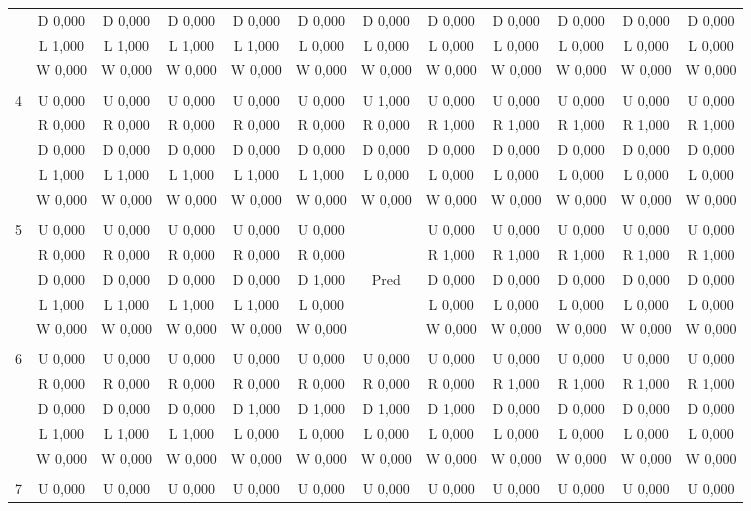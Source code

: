 \begin{table}[htbp]
\begin{tiny}
\begin{tabular}{c|c|c|c|c|c|c|c|c|c|c|c|}
&D 0,000&D 0,000&D 0,000&D 0,000&D 0,000&D 0,000&D 0,000&D 0,000&D 0,000&D 0,000&D 0,000\\
&L 1,000&L 1,000&L 1,000&L 1,000&L 0,000&L 0,000&L 0,000&L 0,000&L 0,000&L 0,000&L 0,000\\
&W 0,000&W 0,000&W 0,000&W 0,000&W 0,000&W 0,000&W 0,000&W 0,000&W 0,000&W 0,000&W 0,000\\
\hline \\
4&U 0,000&U 0,000&U 0,000&U 0,000&U 0,000&U 1,000&U 0,000&U 0,000&U 0,000&U 0,000&U 0,000\\
&R 0,000&R 0,000&R 0,000&R 0,000&R 0,000&R 0,000&R 1,000&R 1,000&R 1,000&R 1,000&R 1,000\\
&D 0,000&D 0,000&D 0,000&D 0,000&D 0,000&D 0,000&D 0,000&D 0,000&D 0,000&D 0,000&D 0,000\\
&L 1,000&L 1,000&L 1,000&L 1,000&L 1,000&L 0,000&L 0,000&L 0,000&L 0,000&L 0,000&L 0,000\\
&W 0,000&W 0,000&W 0,000&W 0,000&W 0,000&W 0,000&W 0,000&W 0,000&W 0,000&W 0,000&W 0,000\\
\hline \\
5&U 0,000&U 0,000&U 0,000&U 0,000&U 0,000&&U 0,000&U 0,000&U 0,000&U 0,000&U 0,000\\
&R 0,000&R 0,000&R 0,000&R 0,000&R 0,000&&R 1,000&R 1,000&R 1,000&R 1,000&R 1,000\\
&D 0,000&D 0,000&D 0,000&D 0,000&D 1,000&Pred&D 0,000&D 0,000&D 0,000&D 0,000&D 0,000\\
&L 1,000&L 1,000&L 1,000&L 1,000&L 0,000&&L 0,000&L 0,000&L 0,000&L 0,000&L 0,000\\
&W 0,000&W 0,000&W 0,000&W 0,000&W 0,000&&W 0,000&W 0,000&W 0,000&W 0,000&W 0,000\\
\hline \\
6&U 0,000&U 0,000&U 0,000&U 0,000&U 0,000&U 0,000&U 0,000&U 0,000&U 0,000&U 0,000&U 0,000\\
&R 0,000&R 0,000&R 0,000&R 0,000&R 0,000&R 0,000&R 0,000&R 1,000&R 1,000&R 1,000&R 1,000\\
&D 0,000&D 0,000&D 0,000&D 1,000&D 1,000&D 1,000&D 1,000&D 0,000&D 0,000&D 0,000&D 0,000\\
&L 1,000&L 1,000&L 1,000&L 0,000&L 0,000&L 0,000&L 0,000&L 0,000&L 0,000&L 0,000&L 0,000\\
&W 0,000&W 0,000&W 0,000&W 0,000&W 0,000&W 0,000&W 0,000&W 0,000&W 0,000&W 0,000&W 0,000\\
\hline \\
7&U 0,000&U 0,000&U 0,000&U 0,000&U 0,000&U 0,000&U 0,000&U 0,000&U 0,000&U 0,000&U 0,000\\

\end{tabular}
\end{tiny}
\end{table}

